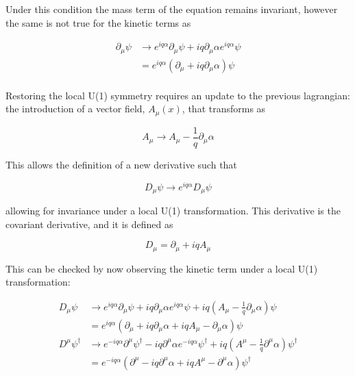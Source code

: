\documentclass[12pt,a4paper,epsf,portrait,times,epsfig]{article}
\begin{document}
	Under this condition the mass term of the equation remains invariant, however the same is not true for the kinetic terms as

	\begin{equation}
		\begin{split}
		\partial_{\mu}\psi &\rightarrow e^{iq\alpha}\partial_{\mu}\psi+iq\partial_{\mu}\alpha e^{iq\alpha}\psi \\
		&= e^{iq\alpha}(\partial_{\mu}+iq\partial_{\mu}\alpha)\psi \\
		\end{split}
	\end{equation}

	Restoring the local U(1) symmetry requires an update to the previous lagrangian: the introduction of a vector field, $A_{\mu}(x)$, that transforms as 
	
	\begin{equation}
		A_{\mu} \rightarrow A_{\mu} - \frac{1}{q} \partial_{\mu} \alpha
	\end{equation}

	This allows the definition of a new derivative such that

	\begin{equation}
		D_{\mu}\psi \rightarrow e^{iq\alpha}D_{\mu}\psi
	\end{equation}

	allowing for invariance under a local U(1) transformation. This derivative is the covariant derivative, and it is defined as

	\begin{equation}
		D_{\mu} = \partial_{\mu} + iqA_{\mu}
	\end{equation}

	This can be checked by now observing the kinetic term under a local U(1) transformation:

	\begin{equation}
		\begin{split}
		D_{\mu}\psi &\rightarrow e^{iq\alpha}\partial_{\mu}\psi + iq\partial_{\mu}\alpha e^{iq\alpha}\psi + iq(A_{\mu}-\frac{1}{q}\partial_{\mu}\alpha)\psi \\
		&= e^{iq\alpha}(\partial_{\mu}+iq\partial_{\mu}\alpha+iqA_{\mu}-\partial_{\mu}\alpha)\psi \\
		D^{\mu}\psi^{\dagger} &\rightarrow e^{-iq\alpha}\partial^{\mu}\psi^{\dagger} - iq\partial^{\mu}\alpha e^{-iq\alpha}\psi^{\dagger} + iq(A^{\mu}-\frac{1}{q}\partial^{\mu}\alpha)\psi^{\dagger} \\
		&= e^{-iq\alpha}(\partial^{\mu}-iq\partial^{\mu}\alpha +iqA^{\mu}-\partial^{\mu}\alpha)\psi^{\dagger}
		\end{split}
	\end{equation}
\end{document}
